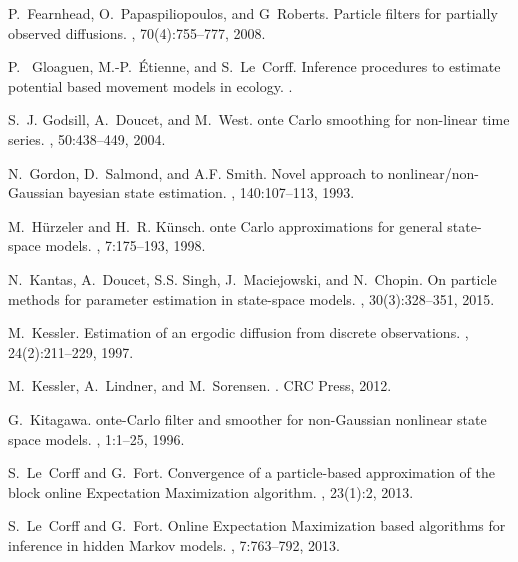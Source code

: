 \documentclass[12pt]{article}
\newcommand{\1}{\mathrm{1}}
\begin{document}
\begin{thebibliography}{10}
P.~Fearnhead, O.~Papaspiliopoulos, and G~Roberts.
\newblock Particle filters for partially observed diffusions.
, 70(4):755--777, 2008.

P.~ Gloaguen, M.-P.~\'Etienne, and S.~Le~Corff.
\newblock Inference procedures to estimate potential based movement models in ecology.
.

S.~J. Godsill, A.~Doucet, and M.~West.
onte {C}arlo smoothing for non-linear time series.
, 50:438--449, 2004.

N.~Gordon, D.~Salmond, and A.F. Smith.
\newblock Novel approach to nonlinear/non-{G}aussian bayesian state estimation.
, 140:107--113, 1993.

M.~H{\"u}rzeler and H.~R. K{\"u}nsch.
onte {C}arlo approximations for general state-space models.
, 7:175--193, 1998.

N.~Kantas, A.~Doucet, S.S. Singh, J.~Maciejowski, and N.~Chopin.
\newblock On particle methods for parameter estimation in state-space models.
, 30(3):328--351, 2015.

M.~Kessler.
\newblock Estimation of an ergodic diffusion from discrete observations.
, 24(2):211--229, 1997.

M.~Kessler, A.~Lindner, and M.~Sorensen.
.
\newblock CRC Press, 2012.

G.~Kitagawa.
onte-{C}arlo filter and smoother for non-{G}aussian nonlinear
  state space models.
, 1:1--25, 1996.

S.~Le~Corff and G.~Fort.
\newblock Convergence of a particle-based approximation of the block online
  {E}xpectation {M}aximization algorithm.
, 23(1):2,
  2013.

S.~Le~Corff and G.~Fort.
\newblock Online {E}xpectation {M}aximization based algorithms for inference in
  hidden {M}arkov models.
, 7:763--792, 2013.


\end{thebibliography}
\end{document}
